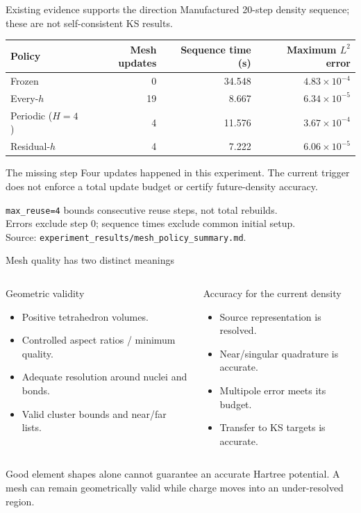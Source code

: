 \documentclass[aspectratio=169,10pt]{beamer}
\begin{document}
\begin{frame}{Existing evidence supports the direction}
\small Manufactured 20-step density sequence; these are \alert{not self-consistent KS results}.
\medskip
\centering
\begin{tabular}{lrrr}
\toprule
Policy & Mesh updates & Sequence time (s) & Maximum $L^2$ error\\
\midrule
Frozen & 0 & 34.548 & $4.83\times10^{-4}$\\
Every-$h$ & 19 & 8.667 & $6.34\times10^{-5}$\\
Periodic ($H=4$) & 4 & 11.576 & $3.67\times10^{-4}$\\
Residual-$h$ & 4 & 7.222 & $6.06\times10^{-5}$\\
\bottomrule
\end{tabular}
\begin{block}{The missing step}
Four updates happened in this experiment. The current trigger does not enforce a total update budget or certify future-density accuracy.
\end{block}
\raggedright\footnotesize
\texttt{max\_reuse=4} bounds consecutive reuse steps, not total rebuilds.\\
Errors exclude step 0; sequence times exclude common initial setup.\\
\color{muted}Source: \texttt{experiment\_results/mesh\_policy\_summary.md}.
\end{frame}

\begin{frame}{Mesh quality has two distinct meanings}
\begin{columns}[T,onlytextwidth]
\begin{block}{Geometric validity}
\begin{itemize}
\item Positive tetrahedron volumes.
\item Controlled aspect ratios / minimum quality.
\item Adequate resolution around nuclei and bonds.
\item Valid cluster bounds and near/far lists.
\end{itemize}
\end{block}
\begin{block}{Accuracy for the current density}
\begin{itemize}
\item Source representation is resolved.
\item Near/singular quadrature is accurate.
\item Multipole error meets its budget.
\item Transfer to KS targets is accurate.
\end{itemize}
\end{block}
\end{columns}
\medskip
\alert{Good element shapes alone cannot guarantee an accurate Hartree potential.}
\smallskip
\small A mesh can remain geometrically valid while charge moves into an under-resolved region.
\end{frame}
\end{document}
